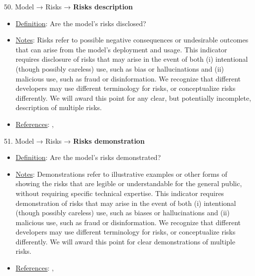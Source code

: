 50. Model → Risks → \textbf{Risks description}
\vspace{-\parskip}
\begin{itemize}
\item
\underline{Definition}: Are the model's risks disclosed?
\item
\underline{Notes}: Risks refer to possible negative consequences or undesirable outcomes that can arise from the model's deployment and usage. This indicator requires disclosure of risks that may arise in the event of both (i) intentional (though possibly careless) use, such as bias or hallucinations and (ii) malicious use, such as fraud or disinformation. We recognize that different developers may use different terminology for risks, or conceptualize risks differently. We will award this point for any clear, but potentially incomplete, description of multiple risks.
\item
\underline{References}: \citet{solaiman2023evaluating}, \citet{weidinger2021ethical}
\end{itemize}


51. Model → Risks → \textbf{Risks demonstration}
\vspace{-\parskip}
\begin{itemize}
\item
\underline{Definition}: Are the model’s risks demonstrated?
\item
\underline{Notes}: Demonstrations refer to illustrative examples or other forms of showing the risks that are legible or understandable for the general public, without requiring specific technical expertise. This indicator requires demonstration of risks that may arise in the event of both (i) intentional (though possibly careless) use, such as biases or hallucinations and (ii) malicious use, such as fraud or disinformation. We recognize that different developers may use different terminology for risks, or conceptualize risks differently. We will award this point for clear demonstrations of multiple risks.
\item
\underline{References}: \citet{solaiman2023evaluating}, \citet{weidinger2021ethical}
\end{itemize}


